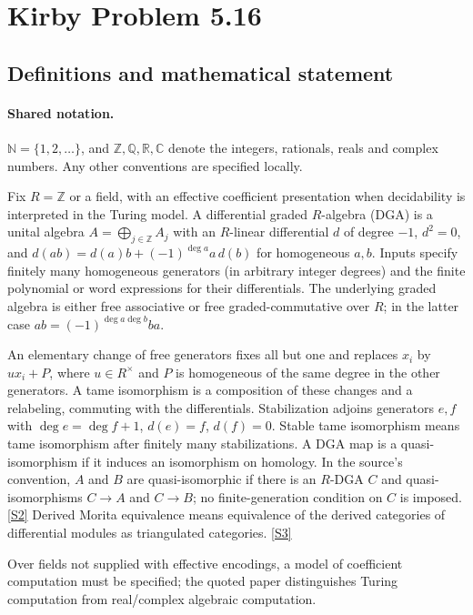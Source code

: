 \documentclass[11pt]{article}
\newcommand{\sref}[2]{\hyperlink{source:#1:#2}{[S#2]}}
\begin{document}
\section{Kirby Problem 5.16}\label{statement}

\subsection{Definitions and mathematical statement}

\paragraph{Shared notation.}$\mathbb N=\{1,2,\ldots\}$, and $\mathbb Z,\mathbb Q,\mathbb R,\mathbb C$ denote the integers, rationals, reals and complex numbers. Any other conventions are specified locally.


Fix $R=\mathbb Z$ or a field, with an effective coefficient presentation when decidability is interpreted in the Turing model. A differential graded $R$-algebra (DGA) is a unital algebra $A=\bigoplus_{j\in\mathbb Z}A_j$ with an $R$-linear differential $d$ of degree $-1$, $d^2=0$, and $d(ab)=d(a)b+(-1)^{\deg a}a\,d(b)$ for homogeneous $a,b$. Inputs specify finitely many homogeneous generators (in arbitrary integer degrees) and the finite polynomial or word expressions for their differentials. The underlying graded algebra is either free associative or free graded-commutative over $R$; in the latter case $ab=(-1)^{\deg a\deg b}ba$.

An elementary change of free generators fixes all but one and replaces $x_i$ by $u x_i+P$, where $u\in R^\times$ and $P$ is homogeneous of the same degree in the other generators. A tame isomorphism is a composition of these changes and a relabeling, commuting with the differentials. Stabilization adjoins generators $e,f$ with $\deg e=\deg f+1$, $d(e)=f$, $d(f)=0$. Stable tame isomorphism means tame isomorphism after finitely many stabilizations. A DGA map is a quasi-isomorphism if it induces an isomorphism on homology. In the source's convention, $A$ and $B$ are quasi-isomorphic if there is an $R$-DGA $C$ and quasi-isomorphisms $C\to A$ and $C\to B$; no finite-generation condition on $C$ is imposed. \sref{statement}{2} Derived Morita equivalence means equivalence of the derived categories of differential modules as triangulated categories. \sref{statement}{3}

Over fields not supplied with effective encodings, a model of coefficient computation must be specified; the quoted paper distinguishes Turing computation from real/complex algebraic computation.
\end{document}
